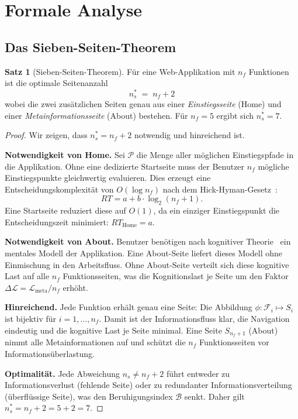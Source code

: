 ﻿\documentclass[a4paper,12pt]{article}
\theoremstyle{definition}
\newtheorem{satz}{Satz}
\begin{document}
\section{Formale Analyse}
\label{sec:formal}

\subsection{Das Sieben-Seiten-Theorem}

\begin{satz}[Sieben-Seiten-Theorem]
\label{satz:siebenSeiten}
    Für eine Web-Applikation mit $n_f$ Funktionen ist die optimale Seitenanzahl
    \[
        n_s^* \;=\; n_f + 2
    \]
    wobei die zwei zusätzlichen Seiten genau aus einer \emph{Einstiegsseite}
    (Home) und einer \emph{Metainformationsseite} (About) bestehen. Für
    $n_f = 5$ ergibt sich $n_s^* = 7$.
\end{satz}

\begin{proof}
    Wir zeigen, dass $n_s^* = n_f + 2$ notwendig und hinreichend ist.

    \textbf{Notwendigkeit von Home.}
    Sei $\mathcal{P}$ die Menge aller möglichen Einstiegspfade in die Applikation.
    Ohne eine dedizierte Startseite muss der Benutzer $n_f$ mögliche Einstiegspunkte
    gleichwertig evaluieren. Dies erzeugt eine Entscheidungskomplexität von
    $O(\log n_f)$ nach dem Hick-Hyman-Gesetz~\cite{hick1952}:
    \[
        RT = a + b \cdot \log_2(n_f + 1).
    \]
    Eine Startseite reduziert diese auf $O(1)$, da ein einziger Einstiegspunkt
    die Entscheidungszeit minimiert: $RT_{\text{Home}} = a$.

    \textbf{Notwendigkeit von About.}
    Benutzer benötigen nach kognitiver Theorie~\cite{norman1988} ein mentales Modell
    der Applikation. Eine About-Seite liefert dieses Modell ohne Einmischung in
    den Arbeitsfluss. Ohne About-Seite verteilt sich diese kognitive Last auf alle
    $n_f$ Funktionsseiten, was die Kognitionslast je Seite um den Faktor
    $\Delta\mathcal{L} = \mathcal{L}_{\text{meta}} / n_f$ erhöht.

    \textbf{Hinreichend.}
    Jede Funktion erhält genau eine Seite: Die Abbildung
    $\phi: \mathcal{F}_i \mapsto S_i$ ist bijektiv für $i = 1, \ldots, n_f$.
    Damit ist der Informationsfluss klar, die Navigation eindeutig und die
    kognitive Last je Seite minimal. Eine Seite $S_{n_f + 1}$ (About) nimmt
    alle Metainformationen auf und schützt die $n_f$ Funktionsseiten vor
    Informationsüberlastung.

    \textbf{Optimalität.}
    Jede Abweichung $n_s \neq n_f + 2$ führt entweder zu Informationsverlust
    (fehlende Seite) oder zu redundanter Informationsverteilung (überflüssige
    Seite), was den Beruhigungsindex $\mathcal{B}$ senkt. Daher gilt
    $n_s^* = n_f + 2 = 5 + 2 = 7$.
\end{proof}
\end{document}

